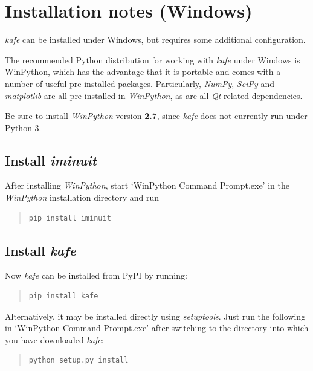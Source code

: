 \documentclass[a4paper,10pt,english]{sphinxmanual}
\begin{document}
\section{Installation notes (Windows)}
\label{installation:installation-notes-windows}
\emph{kafe} can be installed under Windows, but requires some additional configuration.

The recommended Python distribution for working with \emph{kafe} under Windows is
\href{https://winpython.github.io/}{WinPython}, which has the advantage that it is
portable and comes with a number of useful pre-installed packages. Particularly,
\emph{NumPy}, \emph{SciPy} and \emph{matplotlib} are all pre-installed in \emph{WinPython}, as are
all \emph{Qt}-related dependencies.

Be sure to install \emph{WinPython} version \textbf{2.7}, since \emph{kafe} does not currently
run under Python 3.


\subsection{Install \emph{iminuit}}
\label{installation:id1}
After installing \emph{WinPython}, start `WinPython Command Prompt.exe' in the
\emph{WinPython} installation directory and run
\begin{quote}

\begin{Verbatim}[commandchars=\\\{\}]
pip install iminuit
\end{Verbatim}
\end{quote}


\subsection{Install \emph{kafe}}
\label{installation:id2}
Now \emph{kafe} can be installed from PyPI by running:
\begin{quote}

\begin{Verbatim}[commandchars=\\\{\}]
pip install kafe
\end{Verbatim}
\end{quote}

Alternatively, it may be installed directly using \emph{setuptools}. Just run
the following in `WinPython Command Prompt.exe' after switching to the
directory into which you have downloaded \emph{kafe}:
\begin{quote}

\begin{Verbatim}[commandchars=\\\{\}]
python setup.py install
\end{Verbatim}
\end{quote}
\end{document}
